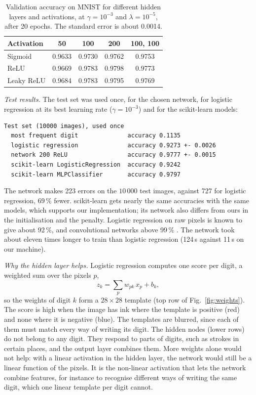 \begin{table}
    \centering
    \caption{Validation accuracy on MNIST for different hidden layers and activations, at $\gamma = 10^{-3}$ and $\lambda = 10^{-5}$, after 20 epochs. The standard error is about 0.0014.}
    \label{tab:e_arch}
    \begin{tabular}{lcccc}
        \toprule
        Activation & 50 & 100 & 200 & 100, 100 \\
        \midrule
        Sigmoid    & 0.9633 & 0.9730 & 0.9762 & 0.9753 \\
        ReLU       & 0.9669 & 0.9783 & 0.9798 & 0.9773 \\
        Leaky ReLU & 0.9684 & 0.9783 & 0.9795 & 0.9769 \\
        \bottomrule
    \end{tabular}
\end{table}

\emph{Test results.} The test set was used once, for the chosen network, for logistic regression at its best learning rate ($\gamma = 10^{-3}$) and for the scikit-learn models:

\noindent\begin{minipage}{\linewidth}
\begin{lstlisting}[style=terminal]
Test set (10000 images), used once
  most frequent digit              accuracy 0.1135
  logistic regression              accuracy 0.9273 +- 0.0026
  network 200 ReLU                 accuracy 0.9777 +- 0.0015
  scikit-learn LogisticRegression  accuracy 0.9242
  scikit-learn MLPClassifier       accuracy 0.9797
\end{lstlisting}
\end{minipage}

The network makes 223 errors on the $10\,000$ test images, against 727 for logistic regression, 69\,\% fewer. scikit-learn gets nearly the same accuracies with the same models, which supports our implementation; its network also differs from ours in the initialisation and the penalty. Logistic regression on raw pixels is known to give about 92\,\%, and convolutional networks above 99\,\% \cite{LeCun1998}. The network took about eleven times longer to train than logistic regression (124\,s against 11\,s on our machine).

\emph{Why the hidden layer helps.} Logistic regression computes one score per digit, a weighted sum over the pixels $p$,
$$
z_k = \sum_{p} w_{pk}\,x_p + b_k ,
$$
so the weights of digit $k$ form a $28\times28$ template (top row of Fig.~\ref{fig:weights}). The score is high when the image has ink where the template is positive (red) and none where it is negative (blue). The templates are blurred, since each of them must match every way of writing its digit. The hidden nodes (lower rows) do not belong to any digit. They respond to parts of digits, such as strokes in certain places, and the output layer combines them. More weights alone would not help: with a linear activation in the hidden layer, the network would still be a linear function of the pixels. It is the non-linear activation that lets the network combine features, for instance to recognise different ways of writing the same digit, which one linear template per digit cannot.

